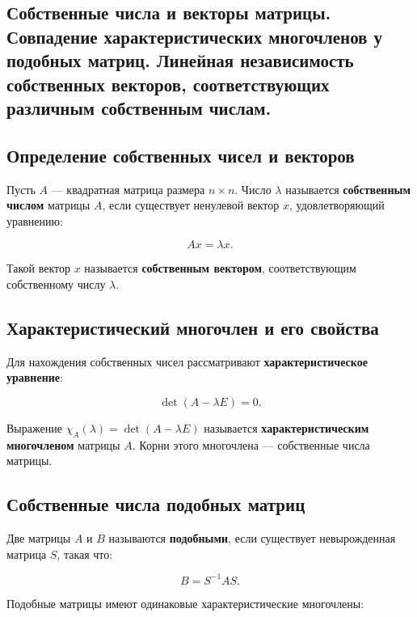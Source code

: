 {
\subsection{
Собственные числа и векторы матрицы. Совпадение характеристических многочленов у подобных матриц. Линейная независимость собственных векторов, соответствующих различным собственным числам. 
}

\subsection*{Определение собственных чисел и векторов}

Пусть $A$ — квадратная матрица размера $n \times n$. Число $\lambda$ называется \textbf{собственным числом} матрицы $A$, если существует ненулевой вектор $x$, удовлетворяющий уравнению:



\[
A x = \lambda x.
\]



Такой вектор $x$ называется \textbf{собственным вектором}, соответствующим собственному числу $\lambda$.

\subsection*{Характеристический многочлен и его свойства}

Для нахождения собственных чисел рассматривают \textbf{характеристическое уравнение}:



\[
\det(A - \lambda E) = 0.
\]



Выражение $\chi_A (\lambda) = \det(A - \lambda E)$ называется \textbf{характеристическим многочленом} матрицы $A$. Корни этого многочлена — собственные числа матрицы.

\subsection*{Собственные числа подобных матриц}

Две матрицы $A$ и $B$ называются \textbf{подобными}, если существует невырожденная матрица $S$, такая что:



\[
B = S^{-1} A S.
\]



Подобные матрицы имеют одинаковые характеристические многочлены:



}
